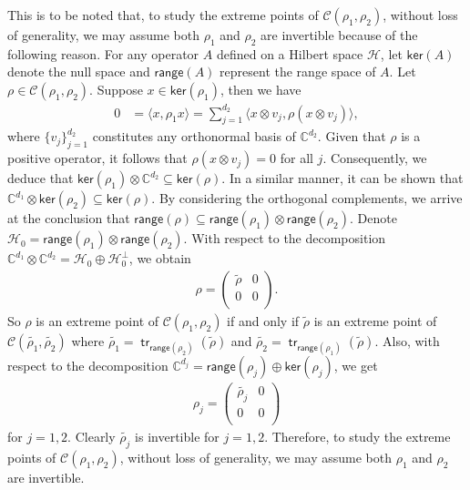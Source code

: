 \documentclass[10pt,reqno]{amsart}
\theoremstyle{definition}
\theoremstyle{plain}
\theoremstyle{remark}
\renewcommand{\sf}[1]{\textsf{#1}}
\newcommand{\mcl}[1]{\mathcal{#1}}
\newcommand{\msc}[1]{\mathscr{#1}}
\newcommand{\ip}[1]{\langle#1\rangle}
\newcommand{\ran}[1]{\sf{range}(#1)}
\renewcommand{\ker}[1]{\sf{ker}(#1)}
\DeclareMathOperator{\tr}{\sf{tr}}
\numberwithin{equation}{section}%
\begin{document}
 
 
 This is to be noted that, to study the extreme points of $\msc{C}(\rho_1,\rho_2)$, without loss of generality, we may assume both $\rho_1$ and $\rho_2$ are invertible because of the following reason. For any operator $A$ defined on a Hilbert space $\mcl{H}$, let $\ker{A}$ denote the null space and $\ran{A}$ represent the range space of $A$. Let $\rho\in\msc{C}(\rho_1,\rho_2)$.
 Suppose $x\in\ker{\rho_1}$, then we have
 \begin{align*}
 	0&=\ip{x,\rho_1x}
 	=\sum_{j=1}^{d_2}\ip{x\otimes v_j,\rho (x\otimes v_j)},
 \end{align*}
 where $\{ v_j\}_{j=1}^{d_2}$ constitutes any orthonormal basis of $\mathbb{C}^{d_2}$. Given that $\rho$ is a positive operator, it follows that $\rho(x\otimes v_j)=0$ for all $j$. Consequently, we deduce that $\ker{\rho_1}\otimes \mathbb{C}^{d_2}\subseteq\ker{\rho}$. In a similar manner, it can be shown that $\mathbb{C}^{d_1}\otimes \ker{\rho_2}\subseteq\ker{\rho}$. By considering the orthogonal complements, we arrive at the conclusion that $\ran{\rho}\subseteq\ran{\rho_1}\otimes\ran{\rho_2}$.  Denote $\mathcal{H}_0=\ran{\rho_1}\otimes\ran{\rho_2}$. With respect to the decomposition $\mathbb{C}^{d_1}\otimes\mathbb{C}^{d_2}=\mathcal{H}_0\oplus\mathcal{H}_0^\perp$, we obtain
 \begin{align*}
 	\rho=\begin{pmatrix}
 		\widetilde{\rho} & 0 \\
 		0 & 0\\
 	\end{pmatrix}.
 \end{align*}
 So $\rho$ is an extreme point of $\msc{C}(\rho_1,\rho_2)$ if and only if $\tilde{\rho}$ is an extreme point of $\msc{C}(\widetilde{\rho_1},\widetilde{\rho_2})$ where $\widetilde{\rho_1}=\tr_{\ran{\rho_2}}(\tilde{\rho})$ and $\widetilde{\rho_2}=\tr_{\ran{\rho_1}}(\tilde{\rho})$. Also, with respect to the decomposition $\mathbb{C}^{d_j}=\ran{\rho_j}\oplus\ker{\rho_j}$, we get
 \begin{align*}
 	\rho_j=\begin{pmatrix}
 		\widetilde{\rho_j}& 0 \\
 		0 & 0\\
 	\end{pmatrix}
\end{align*}
 for $j=1,2$. Clearly $\widetilde{\rho_j}$ is invertible for $j=1,2$. Therefore, to study the extreme points of $\msc{C}(\rho_1,\rho_2)$, without loss of generality, we may assume both $\rho_1$ and $\rho_2$ are invertible. 
 
\end{document}
